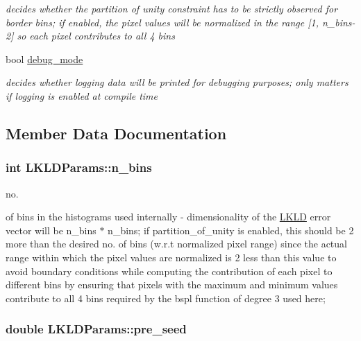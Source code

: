 \begin{DoxyCompactItemize}
\begin{DoxyCompactList}\small\item\em decides whether the partition of unity constraint has to be strictly observed for border bins; if enabled, the pixel values will be normalized in the range \mbox{[}1, n\-\_\-bins-\/2\mbox{]} so each pixel contributes to all 4 bins \end{DoxyCompactList}\item 
\hypertarget{structLKLDParams_a9b44ae823ed206751400a0949fad4d0f}{bool \hyperlink{structLKLDParams_a9b44ae823ed206751400a0949fad4d0f}{debug\-\_\-mode}}\label{structLKLDParams_a9b44ae823ed206751400a0949fad4d0f}

\begin{DoxyCompactList}\small\item\em decides whether logging data will be printed for debugging purposes; only matters if logging is enabled at compile time \end{DoxyCompactList}\end{DoxyCompactItemize}


\subsection{Member Data Documentation}
\hypertarget{structLKLDParams_ae8b0eb3d9be40d306935dfeeef2c6077}{
\subsubsection[{n\-\_\-bins}]{\setlength{\rightskip}{0pt plus 5cm}int L\-K\-L\-D\-Params\-::n\-\_\-bins}}\label{structLKLDParams_ae8b0eb3d9be40d306935dfeeef2c6077}


no. 

of bins in the histograms used internally -\/ dimensionality of the \hyperlink{classLKLD}{L\-K\-L\-D} error vector will be n\-\_\-bins $\ast$ n\-\_\-bins; if partition\-\_\-of\-\_\-unity is enabled, this should be 2 more than the desired no. of bins (w.\-r.\-t normalized pixel range) since the actual range within which the pixel values are normalized is 2 less than this value to avoid boundary conditions while computing the contribution of each pixel to different bins by ensuring that pixels with the maximum and minimum values contribute to all 4 bins required by the bspl function of degree 3 used here; \hypertarget{structLKLDParams_a087e05781a2edef1eced16e97d47a661}{
\subsubsection[{pre\-\_\-seed}]{\setlength{\rightskip}{0pt plus 5cm}double L\-K\-L\-D\-Params\-::pre\-\_\-seed}}\label{structLKLDParams_a087e05781a2edef1eced16e97d47a661}


